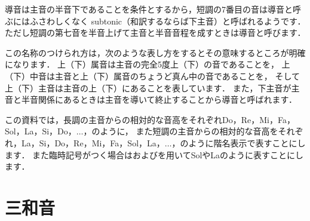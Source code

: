 \documentclass[dvipdfmx,uplatex,b5paper,openany,jbase=12Q,nomag*,textwidth-limit=44%
               ]{gachimuchi}
\begin{document}
導音は主音の半音下であることを条件とするから，短調の7番目の音は導音と呼ぶにはふさわしくなく
subtonic（和訳するならば下主音）と呼ばれるようです．
ただし短調の第七音を半音上げて主音と半音音程を成すときは導音と呼びます．

\begin{Music}
  \nostartrule%
  \Startpiece%
  \Notes%
  \en%
  \endpiece%
  \Startpiece%
  \Notes%
  \en%
  \endpiece%
\end{Music}

この名称のつけられ方は，次のような表し方をするとその意味するところが明確になります．
上（下）属音は主音の完全5度上（下）の音であることを，
上（下）中音は主音と上（下）属音のちょうど真ん中の音であることを，
そして上（下）主音は主音の上（下）にあることを表しています．
また，下主音が主音と半音関係にあるときは主音を導いて終止することから導音と呼ばれます．
\begin{Music}
  \nostartrule%
  \Startpiece%
  \Notes%
  \en%
  \endpiece%
\end{Music}

この資料では，長調の主音からの相対的な音高をそれぞれDo，Re，Mi，Fa，Sol，La，Si，Do，$\ldots$，のように，
また短調の主音からの相対的な音高をそれぞれ，La，Si，Do，Re，Mi，Fa，Sol，La，$\ldots$，のように階名表示で表すことにします．
また臨時記号がつく場合は\txSharp および\txFlat を用いてSol\aSharp やLa\aFlat のように表すことにします．

\section{三和音}
\end{document}

